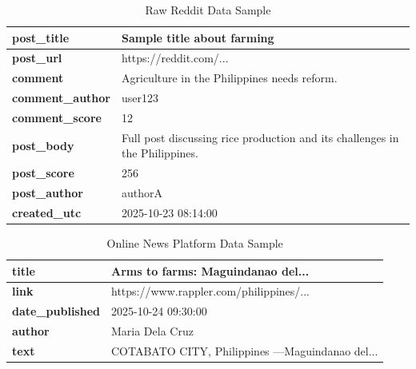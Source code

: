 \documentclass[conference]{IEEEtran}
\begin{document}
\begin{table}[h]
\centering
\caption{Raw Reddit Data Sample \label{tab:redditdatasample}}
    \begin{tabular}{|p{3cm}|p{5cm}|}
    \hline
    \textbf{post\_title} & Sample title about farming \\ \hline
    \textbf{post\_url} & https://reddit.com/... \\ \hline
    \textbf{comment} & Agriculture in the Philippines needs reform. \\ \hline
    \textbf{comment\_author} & user123 \\ \hline
    \textbf{comment\_score} & 12 \\ \hline
    \textbf{post\_body} & Full post discussing rice production and its challenges in the Philippines. \\ \hline
    \textbf{post\_score} & 256 \\ \hline
    \textbf{post\_author} & authorA \\ \hline
    \textbf{created\_utc} & 2025-10-23 08:14:00 \\ \hline
    \end{tabular}
\label{tab:reddit_raw_data}
\end{table}

\begin{table}[h]
\centering
\caption{Online News Platform Data Sample \label{tab:newsplatformsample}}
    \begin{tabular}{|p{3cm}|p{5cm}|}
    \hline
    \textbf{title} & Arms to farms: Maguindanao del... \\ \hline
    \textbf{link} & https://www.rappler.com/philippines/... \\ \hline
    \textbf{date\_published} & 2025-10-24 09:30:00 \\ \hline
    \textbf{author} & Maria Dela Cruz \\ \hline
    \textbf{text} & COTABATO CITY, Philippines —Maguindanao del... \\ \hline
    \end{tabular} 
\label{tab:news_raw_data}
\end{table}



\end{document}
